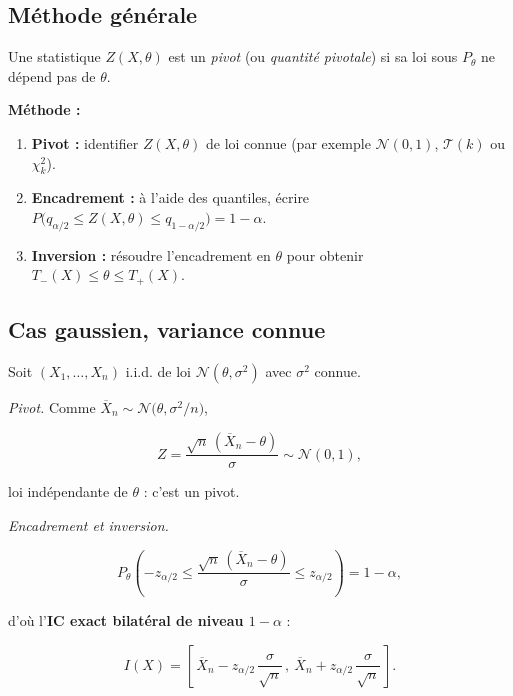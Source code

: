 \subsection{Méthode générale}

\medskip

\begin{mdframed}
\begin{definition}[Pivot]
Une statistique $Z(X,\theta)$ est un \textit{pivot} (ou \textit{quantité pivotale}) si sa loi sous $P_\theta$ ne dépend pas de $\theta$.

\textbf{Méthode :}

\begin{enumerate}
\item \textbf{Pivot :} identifier $Z(X,\theta)$ de loi connue (par exemple $\mathcal N(0,1)$, $\mathcal T(k)$ ou $\chi^2_k$).
\item \textbf{Encadrement :} à l'aide des quantiles, écrire $P\big(q_{\alpha/2} \le Z(X,\theta) \le q_{1-\alpha/2}\big) = 1-\alpha$.
\item \textbf{Inversion :} résoudre l'encadrement en $\theta$ pour obtenir $T_-(X) \le \theta \le T_+(X)$.
\end{enumerate}
\end{definition}
\end{mdframed}

\subsection{Cas gaussien, variance connue}

\begin{exemple}
Soit $(X_1,\dots,X_n)$ i.i.d. de loi $\mathcal N(\theta,\sigma^2)$ avec $\sigma^2$ connue.

\textit{Pivot.} Comme $\overline X_n \sim \mathcal N\!\big(\theta,\sigma^2/n\big)$,

$$
Z = \frac{\sqrt n\,(\overline X_n - \theta)}{\sigma} \sim \mathcal N(0,1),
$$

loi indépendante de $\theta$ : c'est un pivot.

\textit{Encadrement et inversion.}

$$
P_\theta\!\left(-z_{\alpha/2} \le \frac{\sqrt n\,(\overline X_n - \theta)}{\sigma} \le z_{\alpha/2}\right) = 1-\alpha,
$$

d'où l'\textbf{IC exact bilatéral de niveau $1-\alpha$} :

$$
\boxed{\ I(X) = \left[\,\overline X_n - z_{\alpha/2}\,\frac{\sigma}{\sqrt n}\,,\ \overline X_n + z_{\alpha/2}\,\frac{\sigma}{\sqrt n}\,\right].\ }
$$
\end{exemple}

